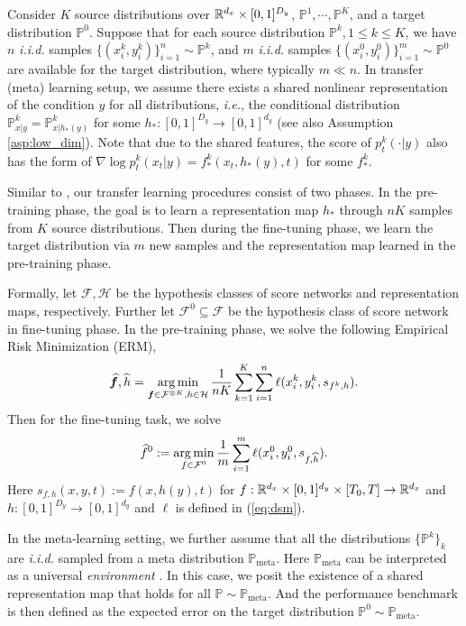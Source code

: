 \documentclass[11pt]{article}
\numberwithin{equation}{section}
\newcommand{\Pmeta}{\mathbb{P}_{\text{meta}}}
\renewcommand{\P}{\mathbb{P}}
\renewcommand{\eqref}[1]{(\ref{#1})}
\begin{document}
Consider $K$ source distributions over $\mathbb{R}^{d_x}\times[0,1]^{D_y}$, $\P^{1},\cdots,\P^K$, and a target distribution $\P^{0}$.
Suppose that for each source distribution $\P^k,1\leq k\leq K$, we have $n$ \textit{i.i.d.} samples $\{(x_i^k,y_i^k)\}_{i=1}^n\sim\P^k$, and $m$ \textit{i.i.d.} samples $\{(x_i^0,y_i^0)\}_{i=1}^m\sim\P^0$ are available for the target distribution, where typically $m\ll n$.
In transfer (meta) learning setup, we assume there exists a shared nonlinear representation of the condition $y$ for all distributions, \textit{i.e.}, the conditional distribution $\P^k_{x|y}=\P^k_{x|h_*(y)}$ for some $h_*:[0,1]^{D_y}\to[0,1]^{d_y}$ (see also Assumption \ref{asp:low_dim}).
Note that due to the shared features, the score of $p_t^{k}(\cdot|y)$ also has the form of $\nabla\log p_t^{k}(x_t|y)=f_*^{k}(x_t, h_*(y), t)$ for some $f_*^{k}$.

Similar to \citet{tripuraneni2020theory}, our transfer learning procedures consist of two phases.
In the pre-training phase, the goal is to learn a representation map $h_*$ through $nK$ samples from $K$ source distributions.
Then during the fine-tuning phase, we learn the target distribution via $m$ new samples and the representation map learned in the pre-training phase.

Formally, let $\mathcal{F},\mathcal{H}$ be the hypothesis classes of score networks and representation maps, respectively.
Further let $\mathcal{F}^0\subseteq\mathcal{F}$ be the hypothesis class of score network in fine-tuning phase.
In the pre-training phase, we solve the following Empirical Risk Minimization (ERM),
\begin{equation}\label{eq:pre-train}
    \widehat{{\bm{f}}},\widehat{h}=\operatorname*{arg\,min}_{{\bm{f}}\in\mathcal{F}^{\otimes K},h\in\mathcal{H}} \frac{1}{nK}\sum_{k=1}^K\sum_{i=1}^n\ell(x_i^k,y_i^k,s_{f^k,h}).
\end{equation}
Then for the fine-tuning task, we solve
\begin{equation}\label{eq:fine-tune}
    \widehat{f}^0:= \operatorname*{arg\,min}_{f\in\mathcal{F}^0} \frac{1}{m}\sum_{i=1}^m \ell(x_i^0,y_i^0,s_{f,\widehat{h}}).
\end{equation}
Here $s_{f,h}(x,y,t):=f(x,h(y),t)$ for $f:\mathbb{R}^{d_x}\times[0,1]^{d_y}\times[T_0,T]\to\mathbb{R}^{d_x}$ and $h:[0,1]^{D_y}\to[0,1]^{d_y}$ and $\ell$ is defined in \eqref{eq:dsm}.

In the meta-learning setting, we further assume that all the distributions $\{\P^k\}_k$ are \textit{i.i.d.} sampled from a meta distribution $\Pmeta$. 
Here $\Pmeta$ can be interpreted as a universal \textit{environment} \citep{baxter2000model,maurer2016benefit}.
In this case, we posit the existence of a shared representation map that holds for all $\P\sim\Pmeta$.
And the performance benchmark is then defined as the expected error on the target distribution $\P^0\sim\Pmeta$.
\end{document}
